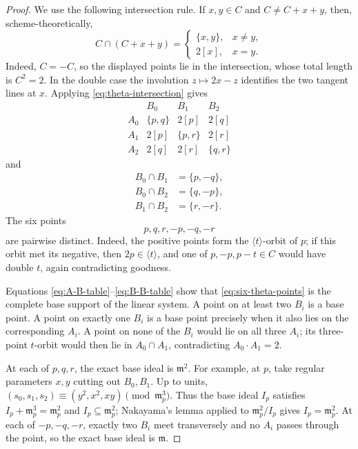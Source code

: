 \documentclass[12pt]{amsart}
\numberwithin{equation}{section}
\theoremstyle{definition}
\theoremstyle{remark}
\begin{document}
\begin{proof}
We use the following intersection rule.  If $x,y\in C$ and
$C\neq C+x+y$, then, scheme-theoretically,
\begin{equation}
 C\cap(C+x+y)=
 \begin{cases}
   \{x,y\},&x\neq y,\\
   2[x],&x=y.
 \end{cases}
\label{eq:theta-intersection}
\end{equation}
Indeed, $C=-C$, so the displayed points lie in the intersection, whose
total length is $C^2=2$.  In the double case the involution
$z\mapsto2x-z$ identifies the two tangent lines at $x$.
Applying \eqref{eq:theta-intersection} gives
\begin{equation}
\begin{array}{c|ccc}
 &B_0&B_1&B_2\\ \hline
A_0&\{p,q\}&2[p]&2[q]\\
A_1&2[p]&\{p,r\}&2[r]\\
A_2&2[q]&2[r]&\{q,r\}
\end{array}
\label{eq:A-B-table}
\end{equation}
and
\begin{equation}
\begin{aligned}
 B_0\cap B_1&=\{p,-q\},\\
 B_0\cap B_2&=\{q,-p\},\\
 B_1\cap B_2&=\{r,-r\}.
\end{aligned}
\label{eq:B-B-table}
\end{equation}
The six points
\begin{equation}
  p,q,r,-p,-q,-r
\label{eq:six-theta-points}
\end{equation}
are pairwise distinct.  Indeed, the positive points form the
$\langle t\rangle$-orbit of $p$; if this orbit met its negative, then
$2p\in\langle t\rangle$, and one of $p,-p,p-t\in C$ would have double
$t$, again contradicting goodness.

Equations \eqref{eq:A-B-table}--\eqref{eq:B-B-table} show that
\eqref{eq:six-theta-points} is the complete base support of the linear system.
A point on at least two $B_i$ is a base point.  A point on exactly one
$B_i$ is a base point precisely when it also lies on the corresponding
$A_i$.  A point on none of the $B_i$ would lie on all three $A_i$; its
three-point $t$-orbit would then lie in $A_0\cap A_1$, contradicting
$A_0\cdot A_1=2$.

At each of $p,q,r$, the exact base ideal is $\mathfrak m^2$.  For example,
at $p$, take regular parameters $x,y$ cutting out $B_0,B_1$.  Up to
units,
$(s_0,s_1,s_2)\equiv(y^2,x^2,xy)\pmod{\mathfrak m_p^3}$.
Thus the base ideal $I_p$ satisfies
$I_p+\mathfrak m_p^3=\mathfrak m_p^2$ and
$I_p\subseteq\mathfrak m_p^2$; Nakayama's lemma applied to
$\mathfrak m_p^2/I_p$ gives $I_p=\mathfrak m_p^2$.
At each of $-p,-q,-r$, exactly two $B_i$ meet transversely and no $A_i$
passes through the point, so the exact base ideal is $\mathfrak m$.


\end{proof}
\end{document}
